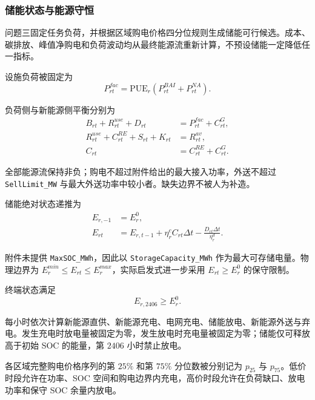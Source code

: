 \subsubsection{储能状态与能源守恒}

问题三固定任务负荷，并根据区域购电价格四分位规则生成储能可行候选。成本、碳排放、峰值净购电和负荷波动均从最终能源流重新计算，不预设储能一定降低任一指标。

设施负荷被固定为
\begin{equation}
P_{rt}^{fac}=
\mathrm{PUE}_r\left(P_{rt}^{BAI}+P_{rt}^{NA}\right).
\end{equation}

负荷侧与新能源侧平衡分别为
\begin{align}
B_{rt}+R_{rt}^{use}+D_{rt}
&=P_{rt}^{fac}+C_{rt}^{G},\\
R_{rt}^{use}+C_{rt}^{RE}+S_{rt}+K_{rt}
&=R_{rt}^{av},\\
C_{rt}&=C_{rt}^{RE}+C_{rt}^{G}.
\label{eq:q3-energy}
\end{align}

全部能源流保持非负；购电不超过附件给出的最大接入功率，外送不超过 \texttt{SellLimit\_MW} 与最大外送功率中较小者。缺失边界不被人为补造。

储能绝对状态递推为
\begin{align}
E_{r,-1}&=E_r^0,\\
E_{rt}
&=E_{r,t-1}+\eta_r^cC_{rt}\Delta t
-\frac{D_{rt}\Delta t}{\eta_r^d}.
\label{eq:soc}
\end{align}

附件未提供 \texttt{MaxSOC\_MWh}，因此以 \texttt{StorageCapacity\_MWh} 作为最大可存储电量。物理边界为 $E_r^{min}\le E_{rt}\le E_r^{max}$，实际启发式进一步采用 $E_{rt}\ge E_r^0$ 的保守限制。

终端状态满足
\begin{equation}
E_{r,2406}\ge E_r^0.
\end{equation}

每小时依次计算新能源直供、新能源充电、电网充电、储能放电、新能源外送与弃电。发生充电时放电量被固定为零，发生放电时充电量被固定为零；储能仅可释放高于初始 SOC 的能量，第 $2406$ 小时禁止放电。

各区域完整购电价格序列的第 $25\%$ 和第 $75\%$ 分位数被分别记为 $p_{25}$ 与 $p_{75}$。低价时段允许在功率、SOC 空间和购电边界内充电，高价时段允许在负荷缺口、放电功率和保守 SOC 余量内放电。

